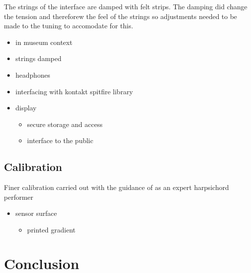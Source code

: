 The strings of the interface are damped with felt strips. The damping
did change the tension and thereforew the feel of the strings so
adjustments needed to be made to the tuning to accomodate for this.

\begin{itemize}
\item
  in museum context
\item
  strings damped
\item
  headphones
\item
  interfacing with kontakt spitfire library
\item
  display

  \begin{itemize}
  \item
    secure storage and access
  \item
    interface to the public
  \end{itemize}
\end{itemize}

\subsection{Calibration}\label{calibration}

Finer calibration carried out with the guidance of  as
an expert harpsichord performer

\begin{itemize}
\item
  sensor surface

  \begin{itemize}
  \item
    printed gradient
  \end{itemize}
\end{itemize}

\section{Conclusion}\label{conclusion}

